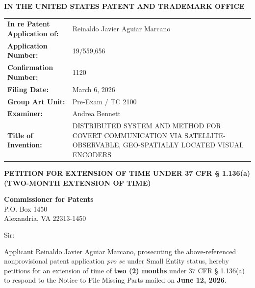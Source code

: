 \documentclass[11pt,letterpaper]{article}
\begin{document}
\thispagestyle{empty}

\begin{center}
    \large\textbf{IN THE UNITED STATES PATENT AND TRADEMARK OFFICE} \\
\end{center}

\vspace{0.3cm}
\noindent\begin{tabular}{p{2.3in}p{4.0in}}
\textbf{In re Patent Application of:} & Reinaldo Javier Aguiar Marcano \\
\textbf{Application Number:} & 19/559,656 \\
\textbf{Confirmation Number:} & 1120 \\
\textbf{Filing Date:} & March 6, 2026 \\
\textbf{Group Art Unit:} & Pre-Exam / TC 2100 \\
\textbf{Examiner:} & Andrea Bennett \\
\textbf{Title of Invention:} & DISTRIBUTED SYSTEM AND METHOD FOR COVERT COMMUNICATION VIA SATELLITE-OBSERVABLE, GEO-SPATIALLY LOCATED VISUAL ENCODERS \\
\end{tabular}

\vspace{0.8cm}
\begin{center}
    \textbf{\large PETITION FOR EXTENSION OF TIME UNDER 37 CFR \S{} 1.136(a) \\
    (TWO-MONTH EXTENSION OF TIME)}
\end{center}

\vspace{0.4cm}
\noindent\textbf{Commissioner for Patents} \\
\noindent P.O. Box 1450 \\
\noindent Alexandria, VA 22313-1450

\vspace{0.4cm}
\noindent Sir:

Applicant Reinaldo Javier Aguiar Marcano, prosecuting the above-referenced nonprovisional patent application \textit{pro se} under Small Entity status, hereby petitions for an extension of time of \textbf{two (2) months} under 37 CFR \S{} 1.136(a) to respond to the Notice to File Missing Parts mailed on \textbf{June 12, 2026}.
\end{document}
